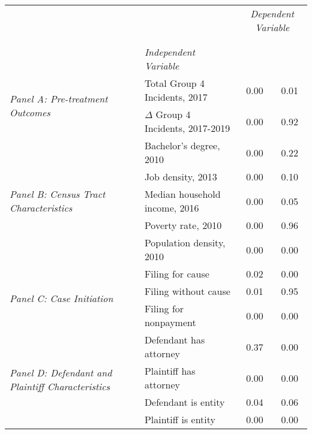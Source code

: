 \begin{tabular}{llcc}
\toprule
 &  & \multicolumn{2}{c}{\textit{Dependent Variable}} \\
\cline{3-4}
\\
 &  &  &  \\
 & \emph{Independent Variable} &  &  \\
\midrule
\multirow[c]{2}{3cm}{\textit{Panel A: Pre-treatment Outcomes}} & Total Group 4 Incidents, 2017 & 0.00 & 0.01 \\
 & $\Delta$ Group 4 Incidents, 2017-2019 & 0.00 & 0.92 \\
\cline{1-4}
\multirow[c]{5}{3cm}{\textit{Panel B: Census Tract Characteristics}} & Bachelor's degree, 2010 & 0.00 & 0.22 \\
 & Job density, 2013 & 0.00 & 0.10 \\
 & Median household income, 2016 & 0.00 & 0.05 \\
 & Poverty rate, 2010 & 0.00 & 0.96 \\
 & Population density, 2010 & 0.00 & 0.00 \\
\cline{1-4}
\multirow[c]{3}{3cm}{\textit{Panel C: Case Initiation}} & Filing for cause & 0.02 & 0.00 \\
 & Filing without cause & 0.01 & 0.95 \\
 & Filing for nonpayment & 0.00 & 0.00 \\
\cline{1-4}
\multirow[c]{4}{3cm}{\textit{Panel D: Defendant and Plaintiff Characteristics}} & Defendant has attorney & 0.37 & 0.00 \\
 & Plaintiff has attorney & 0.00 & 0.00 \\
 & Defendant is entity & 0.04 & 0.06 \\
 & Plaintiff is entity & 0.00 & 0.00 \\
\cline{1-4}
\bottomrule
\end{tabular}
